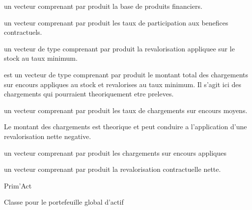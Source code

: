 \documentclass[a4paper]{book}
\begin{document}
\begin{Arguments}
\begin{ldescription}
\item[\code{base\_fin}] un vecteur  comprenant par produit la base de produits financiers.

\item[\code{tx\_pb}] un vecteur  comprenant par produit les taux de participation aux benefices contractuels.

\item[\code{rev\_stock\_brut}] un vecteur de type  comprenant par produit la revalorisation
appliquee sur le stock au taux minimum.

\item[\code{ch\_enc\_th}] est un vecteur de type  comprenant par produit le montant total
des chargements sur encours appliques au stock et revalorises au taux minimum. Il s'agit ici des chargements
qui pourraient theoriquement etre preleves.

\item[\code{tx\_enc\_moy}] un vecteur  comprenant par produit
les taux de chargements sur encours moyens.
\end{ldescription}
\end{Arguments}
%
\begin{Details}\relax
Le montant des chargements  est theorique et peut
conduire a l'application d'une revalorisation nette negative.
\end{Details}
%
\begin{Value}
 un vecteur comprenant par produit les chargements sur encours appliques

 un vecteur comprenant par produit la
revalorisation contractuelle nette.
\end{Value}
%
\begin{Author}\relax
Prim'Act
\end{Author}
%
\begin{Description}\relax
Classe pour le portefeuille global d'actif
\end{Description}
%
\end{document}
